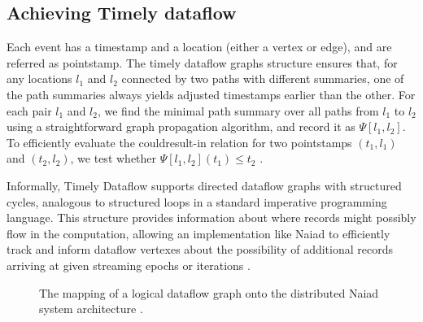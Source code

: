 \documentclass[9pt,twocolumn,twoside]{../../styles/osajnl}
\begin{document}
\subsection{Achieving Timely dataflow}
Each event has a timestamp and a location (either a vertex or edge),
and are referred as pointstamp. The timely dataflow graphs structure
ensures that, \GE for any locations $l_1$ and $l_2$ connected by two paths
with different summaries, one of the path summaries always yields
adjusted timestamps earlier than the other. For each pair $l_1$ and
$l_2$, we find the minimal path summary over all paths from $l_1$ to
$l_2$ using a straightforward graph propagation algorithm, and record
it as $\Psi[l_1, l_2]$. To efficiently evaluate the couldresult-in
relation for two pointstamps $(t_1, l_1)$ and $(t_2, l_2)$, we test
whether $\Psi[l_1, l_2](t_1) \le t_2$ \cite{paper1-Naiad}.

Informally, Timely Dataflow supports directed dataflow graphs with
structured cycles, analogous to structured loops in a standard
imperative programming language. This structure provides information
about where records might possibly flow in the computation, allowing
an implementation like Naiad to efficiently track and inform dataflow
vertexes about the possibility of additional records arriving at given
streaming epochs or iterations \cite{www-naiad}.

\begin{figure}[htbp]
\centering
{}
\caption{The mapping of a logical dataflow graph onto the distributed
  Naiad system architecture \cite{paper1-Naiad}.}
\label{Naiad-LDF}
\end{figure}
\end{document}
